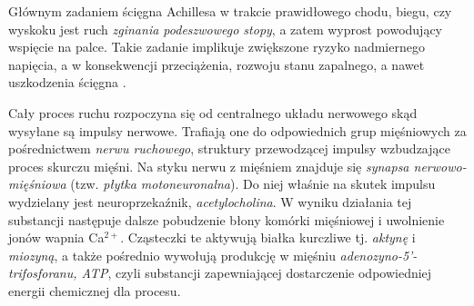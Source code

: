 Głównym zadaniem ścięgna Achillesa w trakcie prawidłowego chodu, biegu, czy wyskoku jest ruch \textit{zginania podeszwowego stopy}, a zatem wyprost powodujący wspięcie na palce. Takie zadanie implikuje zwiększone ryzyko nadmiernego napięcia, a w konsekwencji przeciążenia, rozwoju stanu zapalnego, a nawet uszkodzenia ścięgna \cite{Etiologia}.

Cały proces ruchu rozpoczyna się od centralnego układu nerwowego skąd wysyłane są impulsy nerwowe. Trafiają one do odpowiednich grup mięśniowych za pośrednictwem \textit{nerwu ruchowego}, struktury  przewodzącej impulsy wzbudzające proces skurczu mięśni. Na styku nerwu z mięśniem znajduje się \textit{synapsa nerwowo-mięśniowa} (tzw. \textit{płytka motoneuronalna}). Do niej właśnie na skutek impulsu wydzielany jest neuroprzekaźnik, \textit{acetylocholina}. W wyniku działania tej substancji następuje dalsze pobudzenie błony komórki mięśniowej i uwolnienie jonów wapnia Ca$^{2+}$. Cząsteczki te aktywują białka kurczliwe tj. \textit{aktynę} i \textit{miozyną}, a także pośrednio wywołują produkcję w mięśniu \textit{adenozyno-5'-trifosforanu, ATP}, czyli substancji zapewniającej dostarczenie odpowiedniej energii chemicznej dla procesu.

